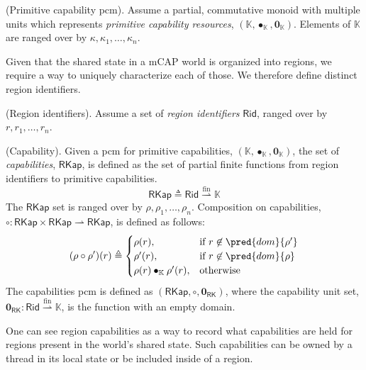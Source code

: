 \begin{param}
	(Primitive capability pcm).
	Assume a partial, commutative monoid with multiple units which represents \emph{primitive capability resources}, $(\mathbb{K}, \bullet_\mathbb{K}, \mathbf{0}_\mathbb{K})$. Elements of $\mathbb{K}$ are ranged over by $\kappa, \kappa_1, \ldots, \kappa_n$.
\end{param}

Given that the shared state in a mCAP world is organized into regions, we require a way to uniquely characterize each of those. We therefore define distinct region identifiers.
\begin{defn}
	(Region identifiers).
	Assume a set of \emph{region identifiers} $\mathsf{Rid}$, ranged over by $r, r_1, \ldots, r_n$.
\end{defn}

\begin{defn}
	(Capability).
	Given a pcm for primitive capabilities, $(\mathbb{K}, \bullet_\mathbb{K}, \mathbf{0}_\mathbb{K})$, the set of \emph{capabilities}, $\mathsf{RKap}$, is defined as the set of partial finite functions from region identifiers to primitive capabilities.
	\[
		\mathsf{RKap} \triangleq \mathsf{Rid} \overset{\text{fin}}{\rightharpoonup} \mathbb{K}
	\]
	The $\mathsf{RKap}$ set is ranged over by $\rho, \rho_1, \ldots, \rho_n$. Composition on capabilities, $\circ : \mathsf{RKap} \times \mathsf{RKap} \rightharpoonup \mathsf{RKap}$, is defined as follows:
	\[
		(\rho \circ \rho') (r)
			\triangleq
		\begin{cases}
			\rho(r), & \text{if } r \not\in \pred{dom}{\rho'}
			\\
			\rho'(r), & \text{if } r \not\in \pred{dom}{\rho}
			\\
			\rho(r) \bullet_\mathbb{K} \rho'(r), & \text{otherwise}
		\end{cases}
	\]
	The capabilities pcm is defined as $(\mathsf{RKap}, \circ, \mathbf{0}_{\mathsf{RK}})$, where the capability unit set, $\mathbf{0}_{\mathsf{RK}} : \mathsf{Rid} \overset{\text{fin}}{\rightharpoonup} \mathbb{K}$, is the function with an empty domain. 
\end{defn}
One can see region capabilities as a way to record what capabilities are held for regions present in the world's shared state. Such capabilities can be owned by a thread in its local state or be included inside of a region.

